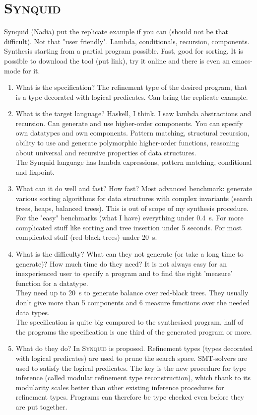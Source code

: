 \section{\mdseries\textsc{Synquid}}
Synquid (Nadia) put the replicate example if you can (should not be that difficult). Not that "user friendly". Lambda, conditionals, recursion, components. Synthesis starting from a partial program possible. Fast, good for sorting. It is possible to download the tool (put link), try it online and there is even an emacs-mode for it.
\begin{enumerate}
\item What is the specification?
The refinement type of the desired program, that is a type decorated with logical predicates. Can bring the replicate example.
\item What is the target language?
Haskell, I think. I saw lambda abstractions and recursion. Can generate and use higher-order components. You can specify own datatypes and own components.
Pattern matching, structural recursion, ability to use and generate polymorphic higher-order functions, reasoning about universal and recursive properties of data structures.\\
The Synquid language has lambda expressions, pattern matching, conditional and fixpoint.
\item What can it do well and fast? How fast?
Most advanced benchmark: generate various sorting algorithms for data structures with complex invariants (search trees, heaps, balanced trees). This is out of scope of my synthesis procedure.
For the "easy" benchmarks (what I have) everything under 0.4~s. For more complicated stuff like sorting and tree insertion under 5 seconds. For most complicated stuff (red-black trees) under 20~s.
\item What is the difficulty? What can they not generate (or take a long time to generate)? How much time do they need?
It is not always easy for an inexperienced user to specify a program and to find the right 'measure' function for a datatype.\\
They need up to 20~s to generate balance over red-black trees. They usually don't give more than 5 components and 6 measure functions over the needed data types.\\
The specification is quite big compared to the synthesised program, half of the programs the specification is one third of the generated program or more.
\item What do they do?
In \cite{SynquidPaper} \textsc{Synquid} is proposed.
Refinement types (types decorated with logical predicates) are used to prune the search space. SMT-solvers are used to satisfy the logical predicates. The key is the new procedure for type inference (called modular refinement type reconstruction), which thank to its modularity scales better than other existing inference procedures for refinement types. Programs can therefore be type checked even before they are put together.
\end{enumerate}

